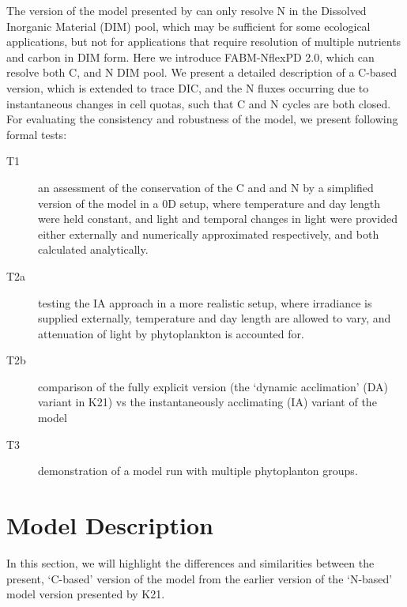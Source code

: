 \documentclass[gmd, manuscript]{copernicus}
\newcommand{\onur}[1]{\textcolor{blue}{\{Onur: #1\}}}
\begin{document}
The version of the model presented by \citet{Kerimoglu2021} can only resolve N in the Dissolved Inorganic Material (DIM) pool, which may be sufficient for some ecological applications, but not for applications that require resolution of multiple nutrients and carbon in DIM form. Here we introduce FABM-NflexPD 2.0, which can resolve both C, and N DIM pool. We present a detailed description of a C-based version, which is extended to trace DIC, and the N fluxes occurring due to instantaneous changes in cell quotas, such that C and N cycles are both closed. For evaluating the consistency and robustness of the model, we present following formal tests:
\begin{description}
 \item [T1] an assessment of the conservation of the C and and N by a simplified version of the model in a 0D setup, where temperature and day length were held constant, and light and temporal changes in light were provided either externally and numerically approximated respectively, and both calculated analytically.
 \item [T2a] testing the IA approach in a more realistic setup, where irradiance is supplied externally, temperature and day length are allowed to vary, and attenuation of light by phytoplankton is accounted for.
 \item [T2b] comparison of the fully explicit version (the `dynamic acclimation' (DA) variant in K21) vs the instantaneously acclimating (IA) variant of the model 
 \item [T3] demonstration of a model run with multiple phytoplanton groups.
\end{description}



\section{Model Description}
In this section, we will highlight the differences and similarities between the present, `C-based' version of the model from the earlier version of the `N-based' model version presented by K21.
\end{document}
